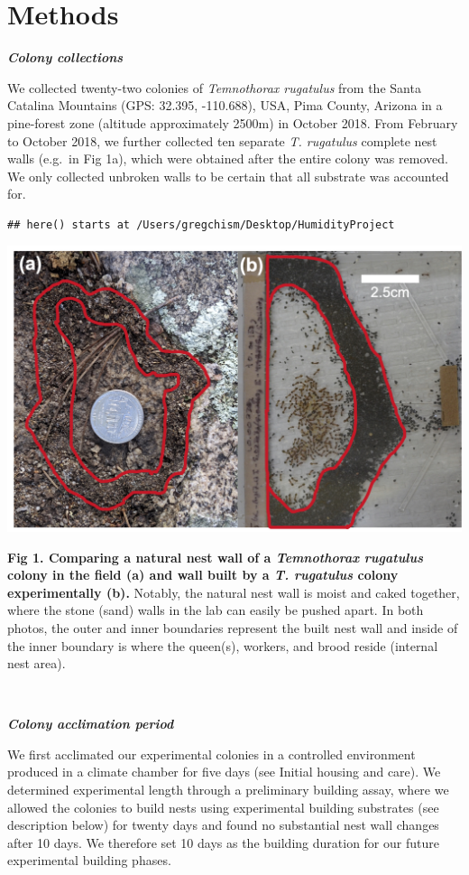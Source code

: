 \documentclass[3p]{elsarticle} %
\begin{document}
\hypertarget{methods}{%
\section{Methods}\label{methods}}

\textbf{\emph{Colony collections}}

We collected twenty-two colonies of \emph{Temnothorax rugatulus} from
the Santa Catalina Mountains (GPS: 32.395, -110.688), USA, Pima County,
Arizona in a pine-forest zone (altitude approximately 2500m) in October
2018. From February to October 2018, we further collected ten separate
\emph{T. rugatulus} complete nest walls (e.g.~in Fig 1a), which were
obtained after the entire colony was removed. We only collected unbroken
walls to be certain that all substrate was accounted for.

\begin{verbatim}
## here() starts at /Users/gregchism/Desktop/HumidityProject
\end{verbatim}

\begin{flushleft}\includegraphics[width=0.75\linewidth,height=0.37\textheight]{../figures/Fig1} \end{flushleft}

\textbf{Fig 1. Comparing a natural nest wall of a \emph{Temnothorax
rugatulus} colony in the field (a) and wall built by a \emph{T.
rugatulus} colony experimentally (b).} Notably, the natural nest wall is
moist and caked together, where the stone (sand) walls in the lab can
easily be pushed apart. In both photos, the outer and inner boundaries
represent the built nest wall and inside of the inner boundary is where
the queen(s), workers, and brood reside (internal nest area).

~

\textbf{\emph{Colony acclimation period}}

We first acclimated our experimental colonies in a controlled
environment produced in a climate chamber for five days (see Initial
housing and care). We determined experimental length through a
preliminary building assay, where we allowed the colonies to build nests
using experimental building substrates (see description below) for
twenty days and found no substantial nest wall changes after 10 days. We
therefore set 10 days as the building duration for our future
experimental building phases.
\end{document}
